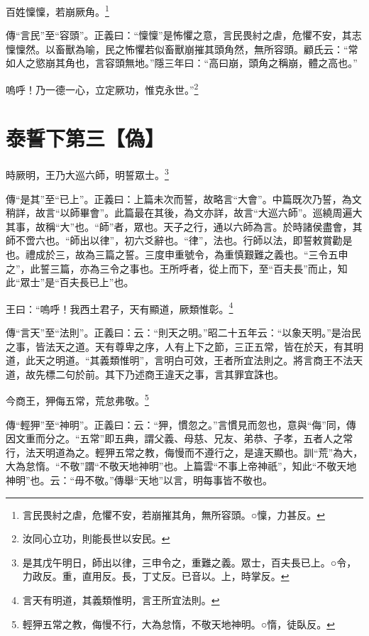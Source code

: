百姓懍懍，若崩厥角。\footnote{言民畏紂之虐，危懼不安，若崩摧其角，無所容頭。○懍，力甚反。}

{\noindent\zhuan{}\fzbyks 傳“言民”至“容頭”。正義曰：“懍懍”是怖懼之意，言民畏紂之虐，危懼不安，其志懍懍然。以畜獸為喻，民之怖懼若似畜獸崩摧其頭角然，無所容頭。顧氏云：“常如人之慾崩其角也，言容頭無地。”隱三年曰：“高曰崩，頭角之稱崩，體之高也。” \par}

嗚呼！乃一德一心，立定厥功，惟克永世。”\footnote{汝同心立功，則能長世以安民。}

\section{泰誓下第三【偽】}


時厥明，王乃大巡六師，明誓眾士。\footnote{是其戊午明日，師出以律，三申令之，重難之義。眾士，百夫長已上。○令，力政反。重，直用反。長，丁丈反。已音以。上，時掌反。}

{\noindent\zhuan{}\fzbyks 傳“是其”至“已上”。正義曰：上篇未次而誓，故略言“大會”。中篇既次乃誓，為文稍詳，故言“以師畢會”。此篇最在其後，為文亦詳，故言“大巡六師”。巡繞周遍大其事，故稱“大”也。“師”者，眾也。天子之行，通以六師為言。於時諸侯盡會，其師不啻六也。“師出以律”，初六爻辭也。“律”，法也。行師以法，即誓敕賞勸是也。禮成於三，故為三篇之誓。三度申重號令，為重慎艱難之義也。“三令五申之”，此誓三篇，亦為三令之事也。王所呼者，從上而下，至“百夫長”而止，知此“眾士”是“百夫長已上”也。 \par}

王曰：“嗚呼！我西土君子，天有顯道，厥類惟彰。\footnote{言天有明道，其義類惟明，言王所宜法則。}

{\noindent\zhuan{}\fzbyks 傳“言天”至“法則”。正義曰：云：“則天之明。”昭二十五年云：“以象天明。”是治民之事，皆法天之道。天有尊卑之序，人有上下之節，三正五常，皆在於天，有其明道，此天之明道。“其義類惟明”，言明白可效，王者所宜法則之。將言商王不法天道，故先標二句於前。其下乃述商王違天之事，言其罪宜誅也。 \par}

今商王，狎侮五常，荒怠弗敬。\footnote{輕狎五常之教，侮慢不行，大為怠惰，不敬天地神明。○惰，徒臥反。}

{\noindent\zhuan{}\fzbyks 傳“輕狎”至“神明”。正義曰：云：“狎，慣忽之。”言慣見而忽也，意與“侮”同，傳因文重而分之。“五常”即五典，謂父義、母慈、兄友、弟恭、子孝，五者人之常行，法天明道為之。輕狎五常之教，侮慢而不遵行之，是違天顯也。訓“荒”為大，大為怠惰。“不敬”謂“不敬天地神明”也。上篇雲“不事上帝神祇”，知此“不敬天地神明”也。云：“毋不敬。”傳舉“天地”以言，明每事皆不敬也。 \par}

